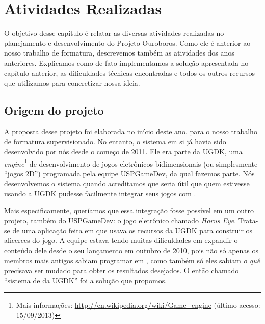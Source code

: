 \chapter{Atividades Realizadas}
\label{sec:atividades}

  O objetivo desse capítulo é relatar as diversas atividades realizadas no 
  planejamento e desenvolvimento do Projeto Ouroboros. Como ele é
  anterior ao nosso trabalho de formatura, descrevemos também as atividades dos
  anos anteriores. Explicamos como de fato implementamos a solução apresentada no
  capítulo anterior, as dificuldades técnicas encontradas e todos os outros
  recursos que utilizamos para concretizar nossa ideia.
  
  \section{Origem do projeto}
  \label{sec:atividades:origem}
  
    A proposta desse projeto foi elaborada no início deste ano, para o nosso
    trabalho de formatura supervisionado. No entanto, o sistema em si já havia
    sido desenvolvido por nós desde o começo de 2011. Ele era parte da UGDK, uma
    \emph{engine}\footnote{Mais informações:
    \url{http://en.wikipedia.org/wiki/Game\_engine} (último acesso: 15/09/2013)}
    de desenvolvimento de jogos eletrônicos bidimensionais (ou
    simplesmente ``jogos 2D'') programada pela equipe USPGameDev, da qual
    fazemos parte. Nós desenvolvemos o sistema quando acreditamos que seria útil
    que quem estivesse usando a UGDK pudesse facilmente integrar seus jogos com .

    Mais especificamente, queríamos que essa integração fosse possível em um
    outro projeto, também do USPGameDev: o jogo eletrônico chamado \emph{Horus
    Eye}\footnotemark. Trata-se de uma aplicação feita em \CXX{} que usava os
    recursos da UGDK para construir os alicerces do jogo. A equipe estava tendo
    muitas dificuldades em expandir o conteúdo dele desde o seu lançamento em
    outubro de 2010, pois não só apenas os membros mais antigos sabiam programar
    em \CXX{}, como também só eles sabiam \emph{o quê} precisava ser mudado para
    obter os resultados desejados. O então chamado ``sistema de  da
    UGDK'' foi a solução que propomos.


